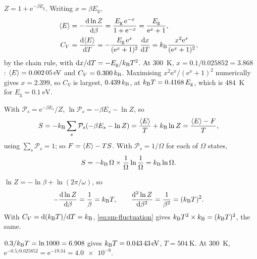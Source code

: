 $Z = 1 + \mathrm{e}^{-\beta E_{\mathrm g}}$.
Writing $x = \beta E_{\mathrm g}$,
\begin{align*}
   \langle E \rangle &= -\frac{\mathrm{d}\ln Z}{\mathrm{d}\beta}
   = \frac{E_{\mathrm g}\,\mathrm{e}^{-x}}{1 + \mathrm{e}^{-x}}
   = \frac{E_{\mathrm g}}{\mathrm{e}^x + 1} ,\\
   C_V &= \frac{\mathrm{d}\langle E \rangle}{\mathrm{d} T}
   = -\frac{E_{\mathrm g}\,\mathrm{e}^x}{(\mathrm{e}^x + 1)^2}\,
   \frac{\mathrm{d} x}{\mathrm{d} T}
   = k_{\mathrm{B}}\frac{x^2\mathrm{e}^x}{(\mathrm{e}^x + 1)^2} ,
\end{align*}
by the chain rule, with $\mathrm{d} x/\mathrm{d} T = -E_{\mathrm g}/k_{\mathrm{B}} T^2$.
At \SI{300}{\kelvin}, $x = 0.1/0.025852 = 3.868$: $\langle E \rangle =
\SI{0.00205}{\electronvolt}$ and $C_V = 0.300\,k_{\mathrm{B}}$. Maximising
$x^2\mathrm{e}^x/(\mathrm{e}^x + 1)^2$ numerically gives $x = 2.399$, so
$C_V$ is largest, $0.439\,k_{\mathrm{B}}$, at $k_{\mathrm{B}} T = 0.4168\,E_{\mathrm g}$, which
is \SI{484}{\kelvin} for $E_{\mathrm g} = \SI{0.1}{\electronvolt}$.

With $\mathcal{P}_s = \mathrm{e}^{-\beta
E_s}/Z$, $\ln\mathcal{P}_s = -\beta E_s - \ln Z$, so
\begin{equation*}
   S = -k_{\mathrm{B}}\sum_s\mathcal{P}_s(-\beta E_s - \ln Z)
   = \frac{\langle E \rangle}{T} + k_{\mathrm{B}}\ln Z = \frac{\langle E \rangle - F}{T} ,
\end{equation*}
using $\sum_s\mathcal{P}_s = 1$; so $F = \langle E \rangle - TS$. With
$\mathcal{P}_s = 1/\Omega$ for each of $\Omega$ states,
\begin{equation*}
   S = -k_{\mathrm{B}}\,\Omega\times\frac1\Omega\ln\frac1\Omega = k_{\mathrm{B}}\ln\Omega .
\end{equation*}

$\ln Z = -\ln\beta + \ln(2\pi/\omega)$, so
\begin{equation*}
   -\frac{\mathrm{d}\ln Z}{\mathrm{d}\beta} = \frac1\beta = k_{\mathrm{B}} T , \qquad
   \frac{\mathrm{d}^2\ln Z}{\mathrm{d}\beta^2} = \frac{1}{\beta^2} = (k_{\mathrm{B}} T)^2 .
\end{equation*}
With $C_V = \mathrm{d}(k_{\mathrm{B}} T)/\mathrm{d} T = k_{\mathrm{B}}$, \cref{eq:sm-fluctuation} gives $k_{\mathrm{B}}
T^2\times k_{\mathrm{B}} = (k_{\mathrm{B}} T)^2$, the same.

$0.3/k_{\mathrm{B}} T = \ln1000 = 6.908$ gives $k_{\mathrm{B}} T =
\SI{0.04343}{\electronvolt}$, $T = \SI{504}{\kelvin}$. At
\SI{300}{\kelvin}, $\mathrm{e}^{-0.5/0.025852} = \mathrm{e}^{-19.34} =
\num{4.0e-9}$.

